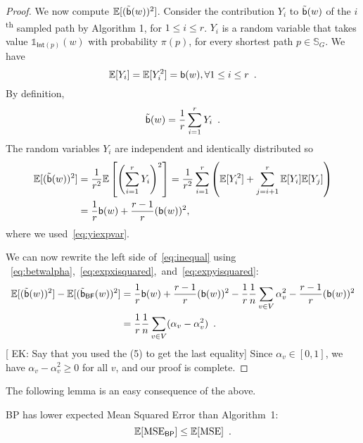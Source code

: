\begin{proof}
We now compute $\mathbb{E}[(\tilde{\mathsf{b}}(w))^2]$. 
Consider the contribution $Y_i$ to $\tilde{\mathsf{b}}(w)$ of the
$i$\textsuperscript{th} sampled path by Algorithm 1, for $1\le i\le r$. $Y_i$ is a random variable that takes value
$\mathds{1}_{\mathsf{Int}(p)}(w)$ with probability $\pi(p)$, for every shortest
path $p\in\mathbb{S}_G$. We have
\begin{equation}\label{eq:yiexpvar}
  \exp[Y_i]=\exp[Y_i^2]=\betw(w), \forall 1\le i \le r\enspace.
\end{equation}
By definition, 
\[
\tilde{\mathsf{b}}(w)=\frac{1}{r}\sum_{i=1}^rY_i\enspace.
\]
The random variables $Y_i$ are independent and identically distributed so
\begin{align}\label{eq:expyisquared}
  \exp[(\tilde\betw(w))^2]&=\frac{1}{r^2}\exp\left[\left(\sum_{i=1}^r
  Y_i\right)^2\right]=\frac{1}{r^2}\sum_{i=1}^r\left(\exp[Y_i^2]+\sum_{j=i+1}^r\exp[Y_i]\exp[Y_j]\right)\nonumber\\
  &=\frac{1}{r}\betw(w)+\frac{r-1}{r}(\betw(w))^2,
\end{align}
where we used~\eqref{eq:yiexpvar}.

We can now rewrite the left side of~\eqref{eq:inequal} using
~\eqref{eq:betwalpha},~\eqref{eq:expxisquared},~and~\eqref{eq:expyisquared}:
\begin{align*}
  \mathbb{E}[(\tilde{\mathsf{b}}(w))^2]-\mathbb{E}[(\tilde{\mathsf{b}}_\mathsf{BF}(w))^2] &=
  \frac{1}{r}\mathsf{b}(w)+\frac{r-1}{r}(\mathsf{b}(w))^2 - \frac{1}{r}\frac{1}{n}\sum_{v\in
    V}\alpha_v^2
   -\frac{r-1}{r}(\mathsf{b}(w))^2\\
   &= \frac{1}{r}\frac{1}{n}\sum_{v\in V}(\alpha_v - \alpha_v^2)\enspace. 
\end{align*}
[ EK: Say that you used the (5) to get the last equality]
Since $\alpha_v\in[0,1]$, we have $\alpha_v-\alpha_v^2\ge 0$ for all $v$, and our proof
is complete.
\end{proof}

The following lemma is an easy consequence of the above.

\begin{lemma}\label{lem:MSE}
  \textsf{BP} has lower expected Mean Squared Error than Algorithm~1:
  \[
  \mathbb{E}[\mathrm{MSE}_\mathsf{BP}]\le \mathbb{E}[\mathrm{MSE}]\enspace.
  \]
\end{lemma}

